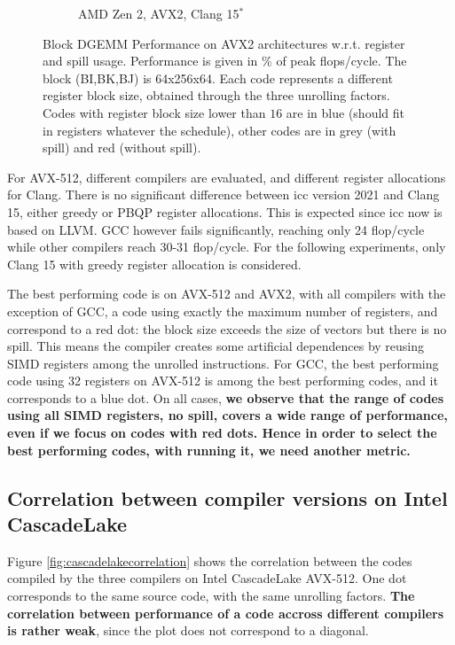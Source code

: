 \documentclass{article}
\begin{document}
\begin{figure}[h!]
\begin{subfigure}[h!]{0.45\textwidth}
  \caption{AMD Zen 2, AVX2, Clang 15$^*$}
  \end{subfigure}
  \caption{Block DGEMM Performance on AVX2 architectures w.r.t. register and spill usage. Performance is given in \% of peak flops/cycle. The block (BI,BK,BJ) is 64x256x64. Each code represents a different register block size, obtained through the three unrolling factors. Codes with register block size lower than $16$ are in blue (should fit in registers whatever the schedule), other codes are in grey (with spill) and red (without spill).  \label{fig:avx2}}
\end{figure}
 

For AVX-512, different compilers are evaluated, and different register allocations for Clang. There is no significant difference between icc version 2021 and Clang
15, either greedy or PBQP register allocations. This is expected since
icc now is based on LLVM. GCC however fails significantly, reaching
only 24 flop/cycle while other compilers reach 30-31 flop/cycle.  For
the following experiments, only Clang 15 with greedy register
allocation is considered.

The best performing code is on AVX-512 and AVX2, with all compilers
with the exception of GCC, a code using exactly the maximum number of
registers, and correspond to a red dot: the block size exceeds the
size of vectors but there is no spill. This means the compiler creates
some artificial dependences by reusing SIMD registers among the
unrolled instructions. For GCC, the best performing code using 32
registers on AVX-512 is among the best performing codes, and it
corresponds to a blue dot. On all cases, \textbf{we observe that the range of
codes using all SIMD registers, no spill, covers a wide range of
performance, even if we focus on codes with red dots. Hence in order to
select the best performing codes, with running it, we need another
metric.}


\subsection{Correlation between compiler versions on Intel CascadeLake}

Figure \ref{fig:cascadelakecorrelation}  shows the correlation between the codes compiled by the three compilers on Intel CascadeLake AVX-512. One dot corresponds to the same source code, with the same unrolling factors. \textbf{The correlation between performance of a code accross different compilers is rather weak}, since the plot does not correspond to a diagonal. 
\end{document}
